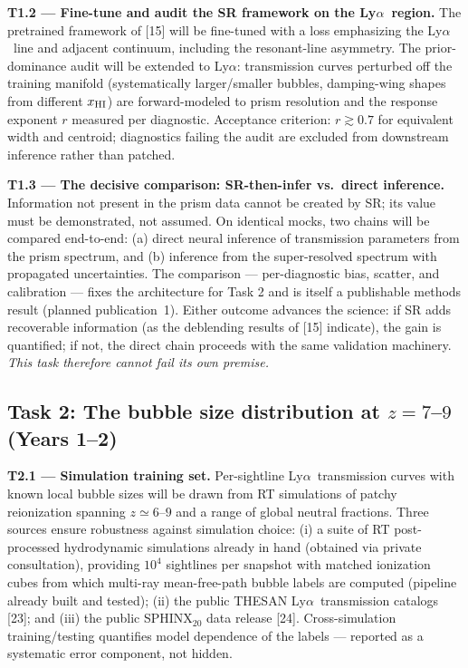 \documentclass[12pt,letterpaper]{article}
\newcommand{\lya}{Ly$\alpha$}
\newcommand{\xhi}{x_{\rm HI}}
\begin{document}
\textbf{T1.2 --- Fine-tune and audit the SR framework on the \lya\
region.} The pretrained framework of [15] will be fine-tuned with a
loss emphasizing the \lya\ line and adjacent continuum, including the
resonant-line asymmetry. The prior-dominance audit will be extended to
\lya: transmission curves perturbed off the training manifold
(systematically larger/smaller bubbles, damping-wing shapes from
different $\xhi$) are forward-modeled to prism resolution and the
response exponent $r$ measured per diagnostic. Acceptance criterion:
$r\gtrsim0.7$ for equivalent width and centroid; diagnostics failing the
audit are excluded from downstream inference rather than patched.

\textbf{T1.3 --- The decisive comparison: SR-then-infer vs.\ direct
inference.} Information not present in the prism data cannot be created
by SR; its value must be demonstrated, not assumed. On identical mocks,
two chains will be compared end-to-end: (a) direct neural inference of
transmission parameters from the prism spectrum, and (b) inference from
the super-resolved spectrum with propagated uncertainties. The comparison
--- per-diagnostic bias, scatter, and calibration --- fixes the
architecture for Task 2 and is itself a publishable methods result
(planned publication~1). Either outcome advances the science: if SR adds
recoverable information (as the deblending results of [15] indicate),
the gain is quantified; if not, the direct chain proceeds with the same
validation machinery. \emph{This task therefore cannot fail its own
premise.}

\subsection{Task 2: The bubble size distribution at $z=7$--$9$ (Years 1--2)}
\label{sec:task2}
\textbf{T2.1 --- Simulation training set.} Per-sightline \lya\
transmission curves with known local bubble sizes will be drawn from RT
simulations of patchy reionization spanning $z\simeq6$--$9$ and a range
of global neutral fractions. Three sources ensure robustness against
simulation choice: (i) a suite of RT post-processed hydrodynamic
simulations already in hand (obtained via private consultation),
providing $10^4$ sightlines per snapshot with matched ionization cubes
from which multi-ray mean-free-path bubble labels are computed (pipeline
already built and tested); (ii) the public THESAN \lya\ transmission
catalogs [23]; and (iii) the public SPHINX$_{20}$ data release [24].
Cross-simulation training/testing quantifies model dependence of the
labels --- reported as a systematic error component, not hidden.
\end{document}
